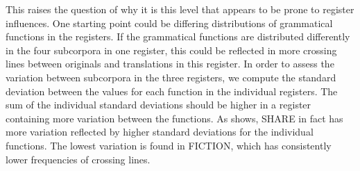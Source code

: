 \documentclass[output=paper]{LSP/langsci}
\begin{document}
This raises the question of why it is this level that appears to be prone to register influences. One starting point could be differing distributions of grammatical functions in the registers. If the grammatical functions are distributed differently in the four subcorpora in one register, this could be reflected in more crossing lines between originals and translations in this register. In order to assess the variation between subcorpora in the three registers, we compute the standard deviation between the values for each function in the individual registers. The sum of the individual standard deviations should be higher in a register containing more variation between the functions. As  shows, SHARE in fact has more variation reflected by higher standard deviations for the individual functions. The lowest variation is found in FICTION, which has consistently lower frequencies of crossing lines. 
\end{document}
